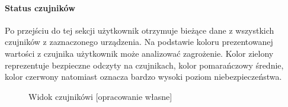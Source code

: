 \paragraph{Status czujników}
Po przejściu do tej sekcji użytkownik otrzymuje bieżące dane z wszystkich czujników z zaznaczonego urządzenia. Na podstawie koloru prezentowanej wartości z czujnika użytkownik może analizować zagrożenie. Kolor zielony reprezentuje bezpieczne odczyty na czujnikach, kolor pomarańczowy średnie, kolor czerwony natomiast oznacza bardzo wysoki poziom niebezpieczeństwa.
\nopagebreak
\begin{figure}[H]
    \centering
    \hfill
    \hfill
    \caption{Widok czujnikówi [opracowanie własne] }
    \label{fig:czujniki}
\end{figure}


